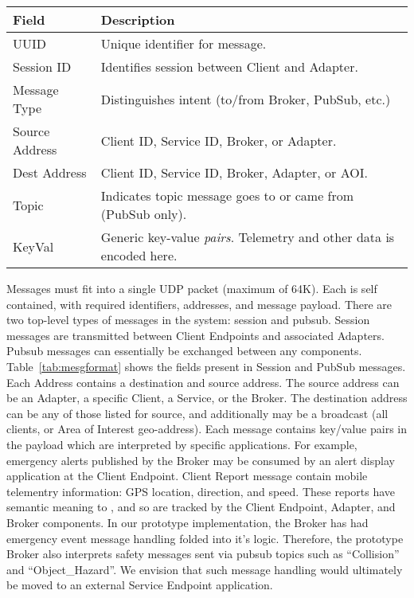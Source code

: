 \begin{table*}[ht]
  \centering
  \begin{tabular}{| l | l |}
    \hline
    \textbf{Field} & \textbf{Description} \\ \hline \hline
    UUID & Unique identifier for message. \\ \hline
    Session ID & Identifies session between Client and Adapter. \\ \hline
    Message Type & Distinguishes intent (to/from Broker, PubSub, etc.) \\ \hline
    Source Address & Client ID, Service ID, Broker, or Adapter. \\ \hline
    Dest Address & Client ID, Service ID, Broker, Adapter, or AOI. \\ \hline
    Topic & Indicates topic message goes to or came from (PubSub only). \\ \hline
    KeyVal & Generic key-value \emph{pairs}. Telemetry and other data is encoded here. \\
    \hline
  \end{tabular}
  \label{tab:mesgformat}
  \caption{Message fields found inside individual \name{} messages.}
\end{table*}

Messages must fit into a single UDP packet (maximum of 64K).  Each is
self contained, with required identifiers, addresses, and message
payload.  There are two top-level types of messages in the \name{} system: 
session and pubsub.  Session messages are transmitted between
Client Endpoints and associated Adapters.  Pubsub messages can
essentially be exchanged between any \name{} components.
Table~\ref{tab:mesgformat} shows the fields present in \name{} Session
and PubSub messages. Each \name{} Address contains a destination and
source address.  The source address can be an Adapter, a specific
Client, a Service, or the Broker.  The destination address can be any
of those listed for source, and additionally may be a broadcast (all
clients, or Area of Interest geo-address).  Each message contains
key/value pairs in the payload which are interpreted by specific
applications. For example, emergency alerts published by the Broker
may be consumed by an alert display application at the Client
Endpoint.  Client Report message contain mobile telementry
information: GPS location, direction, and speed. These reports have
semantic meaning to \name, and so are tracked by the Client
Endpoint, Adapter, and Broker components.  In our prototype
implementation, the Broker has had emergency event message handling
folded into it's logic.  Therefore, the prototype Broker also
interprets safety messages sent via pubsub topics such as
``Collision'' and ``Object\_Hazard''. We envision that such message
handling would ultimately be moved to an external Service Endpoint
application.

